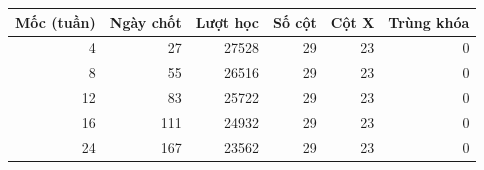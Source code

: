 \begin{tabular}{@{}rrrrrr@{}}
\toprule
\textbf{Mốc (tuần)} & \textbf{Ngày chốt} & \textbf{Lượt học} & \textbf{Số cột} & \textbf{Cột X} & \textbf{Trùng khóa} \\
\midrule
\num{4} & \num{27} & \num{27528} & \num{29} & \num{23} & \num{0} \\
\num{8} & \num{55} & \num{26516} & \num{29} & \num{23} & \num{0} \\
\num{12} & \num{83} & \num{25722} & \num{29} & \num{23} & \num{0} \\
\num{16} & \num{111} & \num{24932} & \num{29} & \num{23} & \num{0} \\
\num{24} & \num{167} & \num{23562} & \num{29} & \num{23} & \num{0} \\
\bottomrule
\end{tabular}
